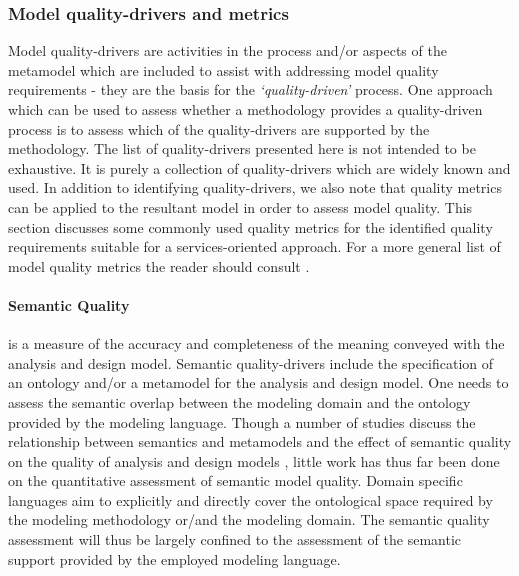 
\subsubsection{Model quality-drivers and metrics}
\label{sec:modelQualityDriversAndMetrics}

Model quality-drivers are activities in the process and/or aspects of the metamodel which are included to assist with addressing model quality requirements - they are the basis for the \emph{`quality-driven'} process. One approach which can be used to assess whether a methodology provides a quality-driven process is to assess which of the quality-drivers are supported by the methodology. The list of quality-drivers presented here is not intended to be exhaustive. It is purely a collection of quality-drivers which are widely known and used. In addition to identifying quality-drivers, we also note that quality metrics can be applied to the resultant model in order to assess model quality. This section discusses some commonly used quality metrics for the identified quality requirements suitable for a services-oriented approach. For a more general list of model quality metrics the reader should consult \cite{mohagheghi_existing_2009}.

\paragraph{Semantic Quality} is a measure of the accuracy and completeness of the meaning conveyed with the analysis and design model. Semantic quality-drivers include the specification of an ontology and/or a metamodel for the analysis and design model. One needs to assess the semantic overlap between the modeling domain and the ontology provided by the modeling language. Though a number of studies discuss the relationship between semantics and metamodels \cite{staab_model_2010,veldhuis_tool_2009,henderson-sellers_bridging_2011} and the effect of semantic quality on the quality of analysis and design models \cite{buder_effects_2010,staab_model_2010}, little work has thus far been done on the quantitative assessment of semantic model quality. Domain specific languages aim to explicitly and directly cover the ontological space required by the modeling methodology or/and the modeling domain. The semantic quality assessment will thus be largely confined to the assessment of the semantic support provided by the employed modeling language.

